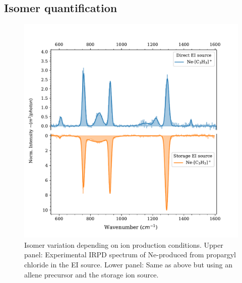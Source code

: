 \subsection{Isomer quantification}
\label{iso}
\vspace{0.5cm}
\begin{figure}
	\centering
		\includegraphics[scale=.7]{chapters/C3H3+ and C3D3+/figures/compare_ion_sources.pdf}
    	\caption{Isomer variation depending on ion production conditions. Upper panel: Experimental IRPD spectrum of Ne-\iso produced from propargyl chloride in the EI source. Lower panel: Same as above but using an allene precursor and the storage ion source.}
    	\label{FIG:compare_sources}
    	
\end{figure}

